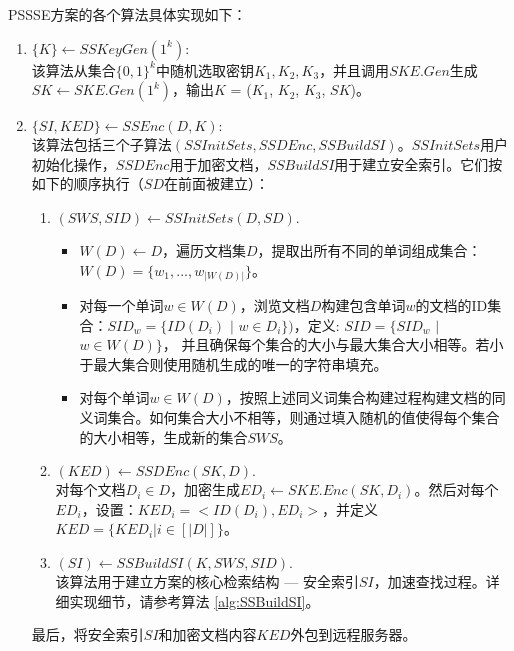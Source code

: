 PSSSE方案的各个算法具体实现如下：
    \begin{enumerate}
      \item
      \textbf{$ \{ K \} \leftarrow SSKeyGen(1^{k}): $} \\
       该算法从集合$ {\{0,1\}}^{k} $中随机选取密钥${ K_1, K_2, K_3 }$，并且调用$SKE.Gen$生成${ SK \leftarrow SKE.Gen(1^{k}) }$，输出$K$ = ($K_1$, $K_2$, $K_3$, $SK$)。

      \item
      \textbf{$\{ SI, KED \} \leftarrow SSEnc(D, K):$ } \\
      该算法包括三个子算法$(SSInitSets, SSDEnc, SSBuildSI)$。$SSInitSets$用户初始化操作，$SSDEnc$用于加密文档，$SSBuildSI$用于建立安全索引。它们按如下的顺序执行（$SD$在前面被建立）：

      \begin{enumerate}
      \item
      \textbf{$ (SWS, SID) \leftarrow SSInitSets(D, SD). $}

      \begin{itemize}
        \item ${ W(D) \leftarrow D }$，遍历文档集$D$，提取出所有不同的单词组成集合：$W(D) = \{w_1, ..., w_{|W(D)|} \}$。

        \item 对每一个单词$ w \in W(D) $，浏览文档$D$构建包含单词$w$的文档的ID集合：$SID_w = \{ID(D_i)$ $|$ $w \in D_i \})$，定义: $SID = \{ SID_{w}$ $|$ $w \in W(D) \}$， 并且确保每个集合的大小与最大集合大小相等。若小于最大集合则使用随机生成的唯一的字符串填充。

        \item 对每个单词$w \in W(D)$，按照上述同义词集合构建过程构建文档的同义词集合。如何集合大小不相等，则通过填入随机的值使得每个集合的大小相等，生成新的集合$SWS$。

      \end{itemize}

      \item
      $ (KED) \leftarrow SSDEnc(SK, D). $ \\
      对每个文档$D_i \in D$，加密生成$ED_i \leftarrow SKE.Enc(SK, D_i)$。然后对每个$ED_i$，设置：$KED_i = <ID(D_i), ED_i>$，并定义$KED = \{ KED_i | i \in [|D|]\}$。

      \item
      ${ (SI) \leftarrow SSBuildSI(K, SWS, SID). }$ \\
      该算法用于建立方案的核心检索结构 --- 安全索引$SI$，加速查找过程。详细实现细节，请参考算法 \ref{alg:SSBuildSI}。
      \end{enumerate}
      最后，将安全索引$SI$和加密文档内容$KED$外包到远程服务器。



\end{enumerate}
